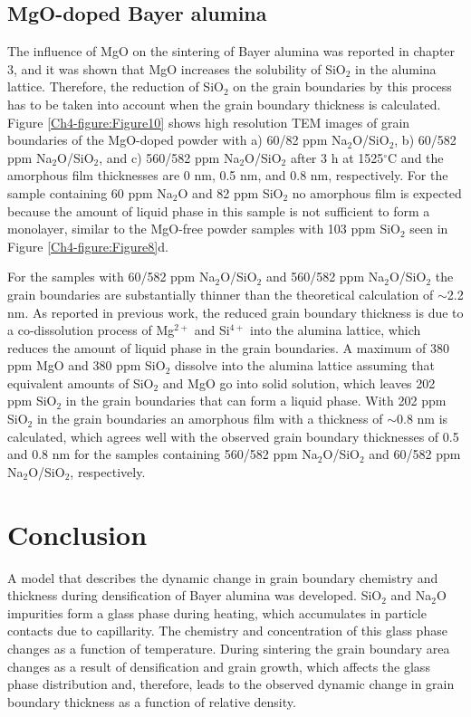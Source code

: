 \subsection{MgO-doped Bayer alumina}
The influence of MgO on the sintering of Bayer alumina was reported in chapter 3, and it was shown that MgO increases the solubility of SiO$_{2}$ in the alumina lattice. Therefore, the reduction of SiO$_{2}$ on the grain boundaries by this process has to be taken into account when the grain boundary thickness is calculated. Figure \ref{Ch4-figure:Figure10} shows high resolution TEM images of grain boundaries of the MgO-doped powder with a) 60/82 ppm Na$_{2}$O/SiO$_{2}$, b) 60/582 ppm Na$_{2}$O/SiO$_{2}$, and c) 560/582 ppm Na$_{2}$O/SiO$_{2}$ after 3 h at 1525$^{\circ}$C and the amorphous film thicknesses are 0 nm, 0.5 nm, and 0.8 nm, respectively. For the sample containing 60 ppm Na$_{2}$O and 82 ppm SiO$_{2}$ no amorphous film is expected because the amount of liquid phase in this sample is not sufficient to form a monolayer, similar to the MgO-free powder samples with 103 ppm SiO$_{2}$ seen in Figure \ref{Ch4-figure:Figure8}d. 

For the samples with 60/582 ppm Na$_{2}$O/SiO$_{2}$ and 560/582 ppm Na$_{2}$O/SiO$_{2}$ the grain boundaries are substantially thinner than the theoretical calculation of $\sim$2.2 nm. As reported in previous work, the reduced grain boundary thickness is due to a co-dissolution process of Mg$^{2+}$ and Si$^{4+}$ into the alumina lattice, which reduces the amount of liquid phase in the grain boundaries. A maximum of 380 ppm MgO and 380 ppm SiO$_{2}$ dissolve into the alumina lattice assuming that equivalent amounts of SiO$_{2}$ and MgO go into solid solution, which leaves 202 ppm SiO$_{2}$ in the grain boundaries that can form a liquid phase. With 202 ppm SiO$_{2}$ in the grain boundaries an amorphous film with a thickness of $\sim$0.8 nm is calculated, which agrees well with the observed grain boundary thicknesses of 0.5 and 0.8 nm for the samples containing 560/582 ppm Na$_{2}$O/SiO$_{2}$ and 60/582 ppm Na$_{2}$O/SiO$_{2}$, respectively.

\section{Conclusion}
A model that describes the dynamic change in grain boundary chemistry and thickness during densification of Bayer alumina was developed. SiO$_{2}$ and Na$_{2}$O impurities form a glass phase during heating, which accumulates in particle contacts due to capillarity. The chemistry and concentration of this glass phase changes as a function of temperature. During sintering the grain boundary area changes as a result of densification and grain growth, which affects the glass phase distribution and, therefore, leads to the observed dynamic change in grain boundary thickness as a function of relative density. 

